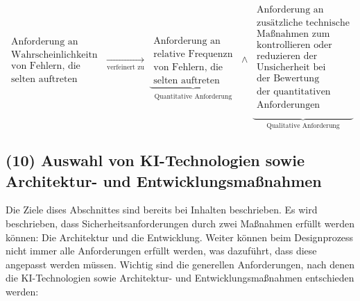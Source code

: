 \[
\begin{array}{c}
\text{Anforderung an}\\
\text{Wahrscheinlichkeitn}\\
\text{von Fehlern, die}\\
\text{selten auftreten}
\end{array}
\;\underset{\text{verfeinert zu}}{\longrightarrow}\;
\underbrace{\begin{array}{c}
\text{Anforderung an}\\
\text{relative Frequenzn}\\
\text{von Fehlern, die}\\
\text{selten auftreten}
\end{array}}_{\substack{\text{Quantitative Anforderung}}}
\;\land\;
\underbrace{\begin{array}{c}
\text{Anforderung an}\\
\text{zusätzliche technische}\\
\text{Maßnahmen zum}\\
\text{kontrollieren oder}\\
\text{reduzieren der}\\
\text{Unsicherheit bei}\\
\text{der Bewertung}\\
\text{der quantitativen}\\
\text{Anforderungen}\\
\end{array}}_{\text{Qualitative Anforderung}}
\]


\subsection{(10) Auswahl von KI-Technologien sowie Architektur- und Entwicklungsmaßnahmen}
Die Ziele dises Abschnittes sind bereits bei Inhalten beschrieben. Es wird beschrieben, dass Sicherheitsanforderungen 
durch zwei Maßnahmen erfüllt werden können: Die Architektur und die Entwicklung. Weiter können beim Designprozess 
nicht immer alle Anforderungen erfüllt werden, was dazuführt, dass diese angepasst werden müssen. Wichtig sind 
die generellen Anforderungen, nach denen die KI-Technologien sowie Architektur- und Entwicklungsmaßnahmen entschieden werden:

